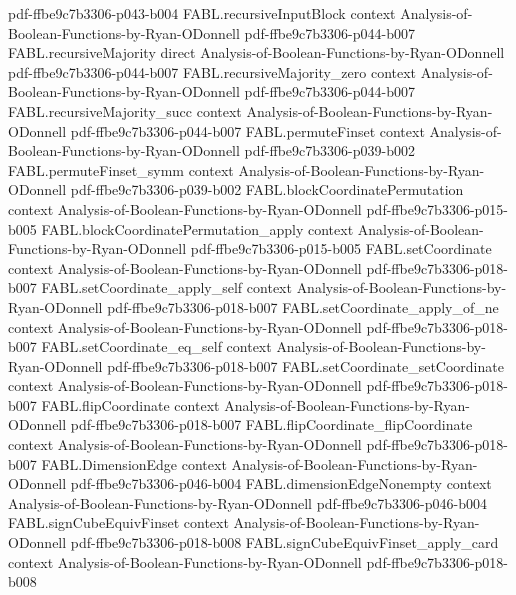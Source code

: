 \begin{theorem}
  {pdf-ffbe9c7b3306-p043-b004}
\proofstep
  {FABL.recursiveInputBlock}
  {context}
  {Analysis-of-Boolean-Functions-by-Ryan-ODonnell}
  {pdf-ffbe9c7b3306-p044-b007}
\proofstep
  {FABL.recursiveMajority}
  {direct}
  {Analysis-of-Boolean-Functions-by-Ryan-ODonnell}
  {pdf-ffbe9c7b3306-p044-b007}
\proofstep
  {FABL.recursiveMajority_zero}
  {context}
  {Analysis-of-Boolean-Functions-by-Ryan-ODonnell}
  {pdf-ffbe9c7b3306-p044-b007}
\proofstep
  {FABL.recursiveMajority_succ}
  {context}
  {Analysis-of-Boolean-Functions-by-Ryan-ODonnell}
  {pdf-ffbe9c7b3306-p044-b007}
\proofstep
  {FABL.permuteFinset}
  {context}
  {Analysis-of-Boolean-Functions-by-Ryan-ODonnell}
  {pdf-ffbe9c7b3306-p039-b002}
\proofstep
  {FABL.permuteFinset_symm}
  {context}
  {Analysis-of-Boolean-Functions-by-Ryan-ODonnell}
  {pdf-ffbe9c7b3306-p039-b002}
\proofstep
  {FABL.blockCoordinatePermutation}
  {context}
  {Analysis-of-Boolean-Functions-by-Ryan-ODonnell}
  {pdf-ffbe9c7b3306-p015-b005}
\proofstep
  {FABL.blockCoordinatePermutation_apply}
  {context}
  {Analysis-of-Boolean-Functions-by-Ryan-ODonnell}
  {pdf-ffbe9c7b3306-p015-b005}
\proofstep
  {FABL.setCoordinate}
  {context}
  {Analysis-of-Boolean-Functions-by-Ryan-ODonnell}
  {pdf-ffbe9c7b3306-p018-b007}
\proofstep
  {FABL.setCoordinate_apply_self}
  {context}
  {Analysis-of-Boolean-Functions-by-Ryan-ODonnell}
  {pdf-ffbe9c7b3306-p018-b007}
\proofstep
  {FABL.setCoordinate_apply_of_ne}
  {context}
  {Analysis-of-Boolean-Functions-by-Ryan-ODonnell}
  {pdf-ffbe9c7b3306-p018-b007}
\proofstep
  {FABL.setCoordinate_eq_self}
  {context}
  {Analysis-of-Boolean-Functions-by-Ryan-ODonnell}
  {pdf-ffbe9c7b3306-p018-b007}
\proofstep
  {FABL.setCoordinate_setCoordinate}
  {context}
  {Analysis-of-Boolean-Functions-by-Ryan-ODonnell}
  {pdf-ffbe9c7b3306-p018-b007}
\proofstep
  {FABL.flipCoordinate}
  {context}
  {Analysis-of-Boolean-Functions-by-Ryan-ODonnell}
  {pdf-ffbe9c7b3306-p018-b007}
\proofstep
  {FABL.flipCoordinate_flipCoordinate}
  {context}
  {Analysis-of-Boolean-Functions-by-Ryan-ODonnell}
  {pdf-ffbe9c7b3306-p018-b007}
\proofstep
  {FABL.DimensionEdge}
  {context}
  {Analysis-of-Boolean-Functions-by-Ryan-ODonnell}
  {pdf-ffbe9c7b3306-p046-b004}
\proofstep
  {FABL.dimensionEdgeNonempty}
  {context}
  {Analysis-of-Boolean-Functions-by-Ryan-ODonnell}
  {pdf-ffbe9c7b3306-p046-b004}
\proofstep
  {FABL.signCubeEquivFinset}
  {context}
  {Analysis-of-Boolean-Functions-by-Ryan-ODonnell}
  {pdf-ffbe9c7b3306-p018-b008}
\proofstep
  {FABL.signCubeEquivFinset_apply_card}
  {context}
  {Analysis-of-Boolean-Functions-by-Ryan-ODonnell}
  {pdf-ffbe9c7b3306-p018-b008}

\end{theorem}
